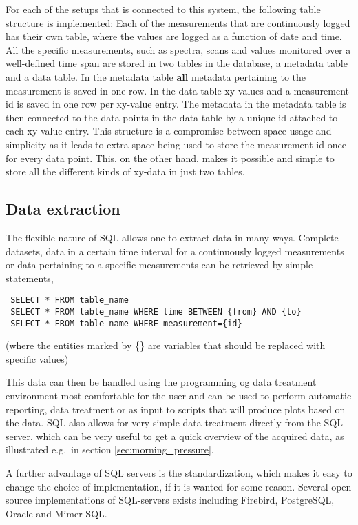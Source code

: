 For each of the setups that is connected to this system, the following table
structure is implemented: Each of the measurements that are continuously logged
has their own table, where the values are logged as a function of date and
time. All the specific measurements, such as spectra, scans and values
monitored over a well-defined time span are stored in two tables in the
database, a metadata table and a data table. In the metadata table \textbf{all}
metadata pertaining to the measurement is saved in one row. In the data table
xy-values and a measurement id is saved in one row per xy-value entry. The
metadata in the metadata table is then connected to the data points in the data
table by a unique id attached to each xy-value entry. This structure is a
compromise between space usage and simplicity as it leads to extra space being
used to store the measurement id once for every data point. This, on the other
hand, makes it possible and simple to store all the different kinds of xy-data
in just two tables.

\subsection{Data extraction} \label{sec:data_extraction}
The flexible nature of SQL allows one to extract data in many ways. Complete
datasets, data in a certain time interval for a continuously logged
measurements or data pertaining to a specific measurements can be retrieved by
simple statements, 
\begin{verbatim}
 SELECT * FROM table_name
 SELECT * FROM table_name WHERE time BETWEEN {from} AND {to}
 SELECT * FROM table_name WHERE measurement={id}
\end{verbatim}
(where the entities marked by \{\} are variables that should be
replaced with specific values)

This data can then be handled using the programming og data treatment environment most
comfortable for the user and can be used to perform automatic reporting, data
treatment or as input to scripts that will produce plots based on the data. SQL
also allows for very simple data treatment directly from the SQL-server,
which can be very useful to get a quick overview of the acquired data, as
illustrated e.g.\ in section \ref{sec:morning_pressure}.

A further advantage of SQL servers is the standardization, which makes it easy
to change the choice of implementation, if it is wanted for some reason.
Several open source implementations of SQL-servers exists including Firebird,
PostgreSQL, Oracle and Mimer SQL.
